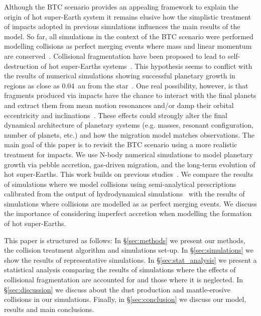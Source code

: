 \documentclass[fleqn,usenatbib]{mnras}
\begin{document}
Although the BTC scenario provides an appealing framework to explain the origin of hot super-Earth system it remains elusive how the simplistic treatment of impacts adopted in previous simulations influences the main results of the model. So far, all simulations in the context of the BTC scenario were performed modelling  collisions as perfect merging events where mass and linear momentum are conserved~\citep{izidoro2017breaking,izidoro2019formation}. Collisional fragmentation have been proposed to lead to self-destruction of hot super-Earths systems~\citep{volkgladman15}. This hypothesis seems to conflict with the results of numerical simulations showing successful planetary growth in regions as close as 0.04~au from the star~\citep{wallace17}. One real possibility, however, is that fragments produced via impacts have the chance to interact with the final planets and extract them from mean motion resonances and/or damp their orbital eccentricity and inclinations~\citep[e.g.][]{chatterjee2015planetesimal}. These effects could strongly alter the final dynamical architecture  of planetary systems (e.g. masses, resonant configuration, number of planets, etc.) and how the migration model matches observations. The main goal of this paper is to revisit the BTC scenario using a more realistic treatment for impacts.  We use N-body numerical simulations to model planetary growth via pebble accretion, gas-driven migration, and the long-term evolution of hot super-Earths. This work builds on previous studies~\citep{izidoro2019formation,lambrechtsetal19,bitschetal19}. We compare the results of simulations where we model collisions using semi-analytical prescriptions  calibrated from the output  of hydrodynamical simulations~\citep{leinhardt2012,stewart12} with the results of simulations where collisions are modelled as as perfect merging events. We discuss the importance of considering imperfect accretion when modelling the formation of hot super-Earths. 
 
This paper is structured as follows: In \S \ref{sec:methods} we present our methods, the collision treatment algorithm and simulations set-up. In \S \ref{sec:simulations} we show the results of representative simulations. In  \S \ref{sec:stat_analysis} we present a statistical analysis comparing the results of simulations where the effects of collisional fragmentation are accounted for and those where it is neglected. In \S \ref{sec:discussion} we discuss about the dust production and mantle-erosive collisions in our simulations. Finally, in \S \ref{sec:conclusion} we discuss our model, results and main conclusions. 
\end{document}

